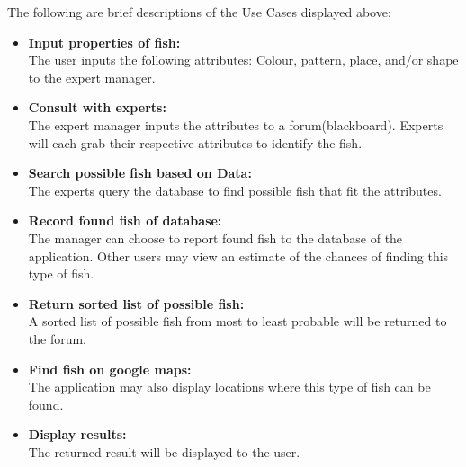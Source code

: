 \documentclass[]{article}
\begin{document}
\FloatBarrier

The following are brief descriptions of the Use Cases displayed above:
\begin{itemize}
\item \textbf{Input properties of fish:} \\
The user inputs the following attributes: Colour, pattern, place, and/or shape to the expert manager.
\item \textbf{Consult with experts:} \\
The expert manager inputs the attributes to a forum(blackboard). Experts will each grab their respective attributes to identify the fish.
\item \textbf{Search possible fish based on Data:} \\
The experts query the database to find possible fish that fit the attributes.
\item \textbf{Record found fish of database:} \\
The manager can choose to report found fish to the database of the application. Other users may view an estimate of the chances of finding this type of fish.
\item \textbf{Return sorted list of possible fish:} \\
A sorted list of possible fish from most to least probable will be returned to the forum.
\item \textbf{Find fish on google maps:} \\
The application may also display locations where this type of fish can be found.
\item \textbf{Display results:} \\
The returned result will be displayed to the user.
\end{itemize}
\end{document}

